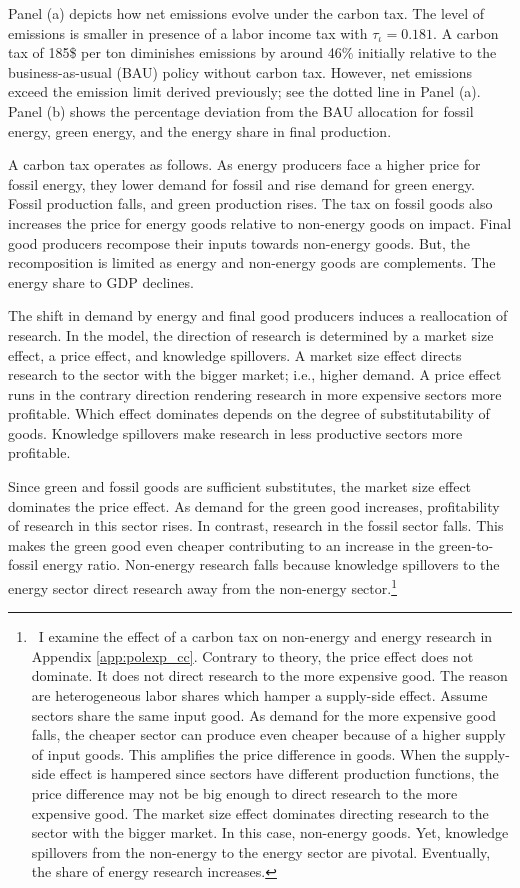Panel (a) depicts how net emissions evolve under the carbon tax. The level of emissions is smaller in presence of a labor income tax with $\tau_{\iota}=0.181$.   A carbon tax of 185\$ per ton diminishes emissions by around 46\% initially relative to the business-as-usual (BAU) policy without carbon tax. However, net emissions exceed the emission limit  derived previously; see the dotted line in Panel (a). Panel (b) shows the percentage deviation from the BAU allocation for fossil energy, green energy, and the energy share in final production. 

  
A carbon tax operates as follows. As energy producers face a higher price for fossil energy, they lower demand for fossil and rise demand for green energy. Fossil production falls, and green production rises.
 The tax on fossil goods also increases the price for energy goods relative to non-energy goods on impact. Final good producers recompose their inputs towards non-energy goods. But, the recomposition is limited as energy and non-energy goods are complements. The energy share to GDP declines.  
 
 The shift in demand by energy and final good producers induces a reallocation of research. In the model, the direction of research is determined by a market size effect, a price effect, and knowledge spillovers. 
 A market size effect directs research to the sector with the bigger market; i.e., higher demand. A price effect runs in the contrary direction rendering research in more expensive sectors more profitable. Which effect dominates depends on the degree of substitutability of goods. Knowledge spillovers make research in less productive sectors more profitable.
 
 Since green and fossil goods are sufficient substitutes, the market size effect dominates the price effect. As demand for the green good increases, profitability of research in  this sector rises. In contrast, research in the fossil sector falls. This makes the green good even cheaper contributing to an increase in the green-to-fossil energy ratio.
Non-energy research falls because knowledge spillovers to the energy sector direct research away from the non-energy sector.\footnote{\ I examine the effect of a carbon tax on non-energy and energy research in Appendix \ref{app:polexp_cc}. Contrary to theory, the price effect does not dominate. It does not direct research to the more expensive good. The reason are heterogeneous labor shares which hamper a supply-side effect. Assume sectors share the same input good. As demand for the more expensive good falls, the cheaper sector can produce even cheaper because of a higher supply of input goods. This amplifies the price difference in goods. When the supply-side effect is hampered since sectors have different production functions, the price difference may not be big enough to direct research to the more expensive good. The market size effect dominates directing research to the sector with the bigger market. In this case, non-energy goods. Yet, knowledge spillovers from the non-energy to the energy sector are pivotal. Eventually, the share of energy research increases.}
 
